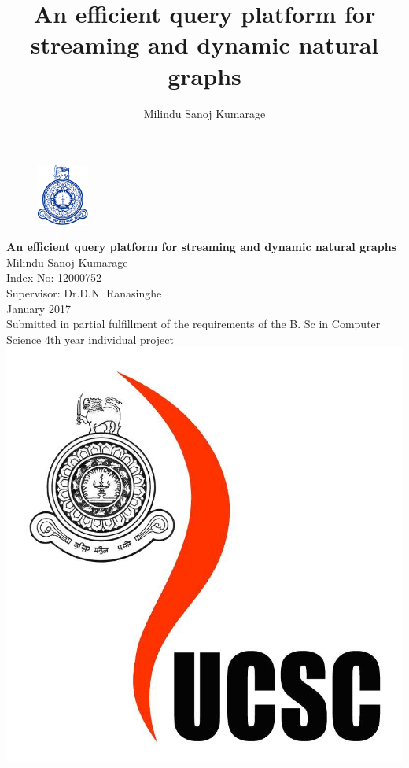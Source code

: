 \documentclass[12pt]{report}
\title{An efficient query platform for streaming and dynamic natural graphs}
\author{Milindu Sanoj Kumarage}
\numberwithin{figure}{section}
\numberwithin{table}{section}
\begin{document}
 

\begin{titlepage}
\newcommand{\HRule}{\rule{\linewidth}{0.5mm}} %
\begin{figure}[H]
\centering
\includegraphics[height=2cm]{uoc}\\[1cm]
\end{figure}
\center 
{ \LARGE \bfseries An efficient query platform for streaming and dynamic natural graphs }\\[1.5cm]
\Large Milindu Sanoj Kumarage\\
\Large Index No: 12000752\\[1cm]
\Large Supervisor: Dr.D.N. Ranasinghe\\[1cm]
\Large January 2017\\[1.5cm]
\large Submitted in partial fulfillment of the requirements of the B. Sc in Computer Science 4th year individual project\\[0.5cm] 
\includegraphics[scale=0.06]{ucsc}
\vfill %
\end{titlepage}
\end{document}
